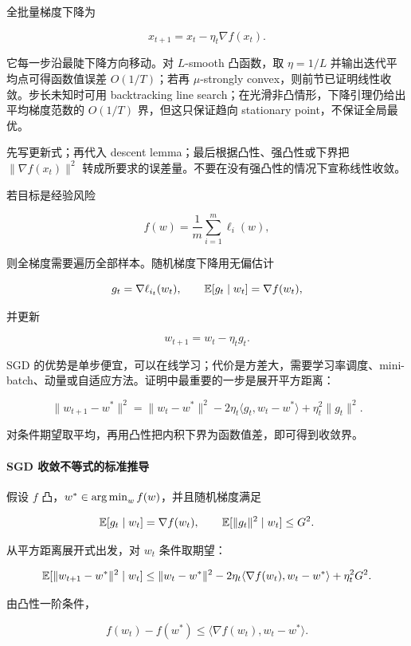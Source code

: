 
全批量梯度下降为

\[
  x_{t+1}=x_t-\eta_t\nabla f(x_t).
\]

它每一步沿最陡下降方向移动。对 \(L\)-smooth 凸函数，取 \(\eta=1/L\) 并输出迭代平均点可得函数值误差 \(O(1/T)\)；若再 \(\mu\)-strongly convex，则前节已证明线性收敛。步长未知时可用 backtracking line search；在光滑非凸情形，下降引理仍给出平均梯度范数的 \(O(1/T)\) 界，但这只保证趋向 stationary point，不保证全局最优。
\begin{examnote}[GD 的解题模板]
先写更新式；再代入 descent lemma；最后根据凸性、强凸性或下界把 \(\|\nabla f(x_t)\|^2\) 转成所要求的误差量。不要在没有强凸性的情况下宣称线性收敛。
\end{examnote}

若目标是经验风险

\[
  f(w)=\frac1m\sum_{i=1}^{m}\ell_i(w),
\]

则全梯度需要遍历全部样本。随机梯度下降用无偏估计

\[
  g_t=\nabla \ell_{i_t}(w_t),
  \qquad
  \mathbb{E}[g_t\mid w_t]=\nabla f(w_t),
\]

并更新

\[
  w_{t+1}=w_t-\eta_t g_t.
\]

SGD 的优势是单步便宜，可以在线学习；代价是方差大，需要学习率调度、mini-batch、动量或自适应方法。证明中最重要的一步是展开平方距离：

\[
  \|w_{t+1}-w^*\|^2
  =
  \|w_t-w^*\|^2
  -
  2\eta_t\langle g_t,w_t-w^*\rangle
  +
  \eta_t^2\|g_t\|^2.
\]

对条件期望取平均，再用凸性把内积下界为函数值差，即可得到收敛界。

\paragraph{SGD 收敛不等式的标准推导}

假设 \(f\) 凸，\(w^*\in\operatorname*{arg\,min}_w f(w)\)，并且随机梯度满足

\[
  \mathbb{E}[g_t\mid w_t]=\nabla f(w_t),
  \qquad
  \mathbb{E}[\|g_t\|^2\mid w_t]\le G^2.
\]

从平方距离展开式出发，对 \(w_t\) 条件取期望：

\[
  \mathbb{E}[\|w_{t+1}-w^*\|^2\mid w_t]
  \le
  \|w_t-w^*\|^2
  -
  2\eta_t\langle\nabla f(w_t),w_t-w^*\rangle
  +
  \eta_t^2G^2.
\]

由凸性一阶条件，

\[
  f(w_t)-f(w^*)
  \le
  \langle\nabla f(w_t),w_t-w^*\rangle.
\]

